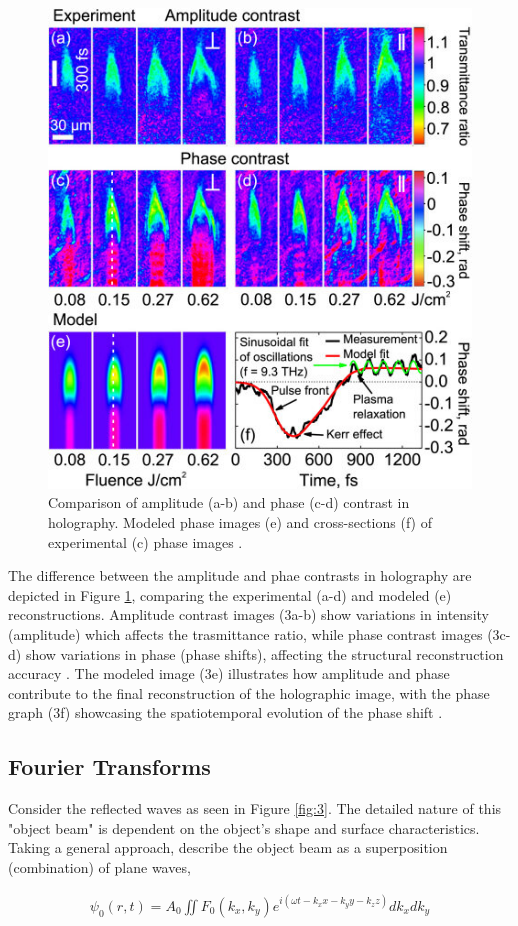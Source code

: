 \documentclass[12pt]{article}
\begin{document}
\begin{figure}[H]
    \centering
    \includegraphics[width=.5\textwidth]{amplitude v phase contrast.jpg}
    \caption{\centering Comparison of amplitude (a-b) and phase (c-d) contrast in holography. Modeled phase images (e) and cross-sections (f) of experimental (c) phase images \protect\cite{ampvphaseimg}.}
    \label{fig:6}
\end{figure}

The difference between the amplitude and phae contrasts in holography are depicted in Figure \ref{fig:6}, comparing the experimental (a-d) and modeled (e) reconstructions.
Amplitude contrast images (3a-b) show variations in intensity (amplitude) which affects the trasmittance ratio, while phase contrast images (3c-d) show variations in phase (phase shifts), affecting the structural reconstruction accuracy \cite{latychevskaia2009simultaneous,ampvphaseimg}.
The modeled image (3e) illustrates how amplitude and phase contribute to the final reconstruction of the holographic image, with the phase graph (3f) showcasing the spatiotemporal evolution of the phase shift \cite{ampvphaseimg}.

\subsection{Fourier Transforms} \label{sec:1.3}

Consider the reflected waves as seen in Figure \ref{fig:3}. The detailed nature of this "object beam" is dependent on the object's shape and surface
characteristics. Taking a general approach, describe the object beam as a superposition (combination) of plane waves,

\vspace{-2ex}
\begin{gather*}
    \psi_0 (r,t) = A_0 \iint F_0 (k_x,k_y) e^{i(\omega t- k_x x- k_y y - k_z z)} dk_x dk_y 
\end{gather*}
\end{document}
